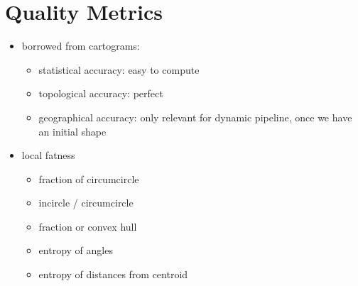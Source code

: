 \section{Quality Metrics}
\label{sect:quality-metrics}


\begin{itemize}
	\item borrowed from cartograms: \begin{itemize}
		\item statistical accuracy: easy to compute
		\item topological accuracy: perfect
		\item geographical accuracy: only relevant for dynamic pipeline, once we have an initial shape
	\end{itemize}
	\item local fatness \begin{itemize}
		\item fraction of circumcircle
		\item incircle / circumcircle
		\item fraction or convex hull
		\item entropy of angles
		\item entropy of distances from centroid
	\end{itemize}
\end{itemize}
